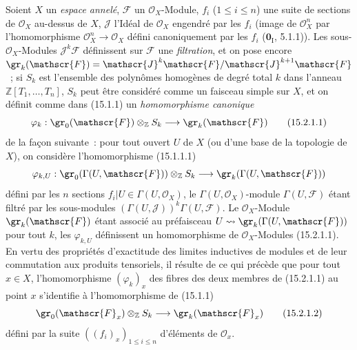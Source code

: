 \begin{env}[15.2.1]
\label{0.15.2.1-fr}
Soient $X$ un \emph{espace annelé}, $\mathscr{F}$ un $\mathcal{O}_X$-Module,
$f_i$ ($1\leq i\leq n$) une suite de sections de $\mathcal{O}_X$ au-dessus
de $X$, $\mathscr{J}$ l'Idéal de $\mathcal{O}_X$ engendré par les $f_i$
(image de $\mathcal{O}_X^n$ par l'homomorphisme
$\mathcal{O}_X^n\to\mathcal{O}_X$ défini canoniquement par les $f_i$
($\mathbf{0}_{\mathrm I}$, 5.1.1)). Les sous-$\mathcal{O}_X$-Modules
$\mathscr{J}^k\mathscr{F}$ définissent sur $\mathscr{F}$ une \emph{filtration}, et
on pose encore
$\gr_k(\mathscr{F})=\mathscr{J}^k\mathscr{F}/\mathscr{J}^{k+1}\mathscr{F}$~;
si $S_k$ est l'ensemble des polynômes homogènes de degré total $k$ dans
l'anneau $\mathbb{Z}[T_1,\ldots,T_n]$, $S_k$ peut être considéré comme un
faisceau simple sur $X$, et on définit comme dans (15.1.1) un \emph{homomorphisme
canonique}
\[
\label{0.15.2.1.1-fr}
  \varphi_k:\gr_0(\mathscr{F})\otimes_{\mathbb Z}S_k
  \longrightarrow\gr_k(\mathscr{F})
\tag{15.2.1.1}
\]
de la façon suivante~: pour tout ouvert $U$ de $X$ (ou d'une base de la
topologie de $X$), on considère l'homomorphisme (15.1.1.1)
\[
  \varphi_{k,U}:\gr_0(\Gamma(U,\mathscr{F}))\otimes_{\mathbb Z}S_k
  \longrightarrow\gr_k(\Gamma(U,\mathscr{F}))
\]
défini par les $n$ sections $f_i|U\in\Gamma(U,\mathcal{O}_X)$, le
$\Gamma(U,\mathcal{O}_X)$-module $\Gamma(U,\mathscr{F})$ étant filtré par les
sous-modules $(\Gamma(U,\mathscr{J}))^k\Gamma(U,\mathscr{F})$. Le
$\mathcal{O}_X$-Module $\gr_k(\mathscr{F})$ étant associé au préfaisceau
$U\leadsto\gr_k(\Gamma(U,\mathscr{F}))$ pour tout $k$, les $\varphi_{k,U}$
définissent un homomorphisme de $\mathcal{O}_X$-Modules (15.2.1.1). En vertu
des propriétés d'exactitude des limites inductives de modules et de leur
commutation aux produits tensoriels, il résulte de ce qui précède que pour
tout $x\in X$, l'homomorphisme $(\varphi_k)_x$ des fibres des deux membres de
(15.2.1.1) au point $x$ s'identifie à l'homomorphisme de (15.1.1)
\[
\label{0.15.2.1.2-fr}
  \gr_0(\mathscr{F}_x)\otimes_{\mathbb Z}S_k
  \longrightarrow\gr_k(\mathscr{F}_x)
\tag{15.2.1.2}
\]
défini par la suite $((f_i)_x)_{1\leq i\leq n}$ d'éléments de
$\mathcal{O}_x$.
\end{env}

